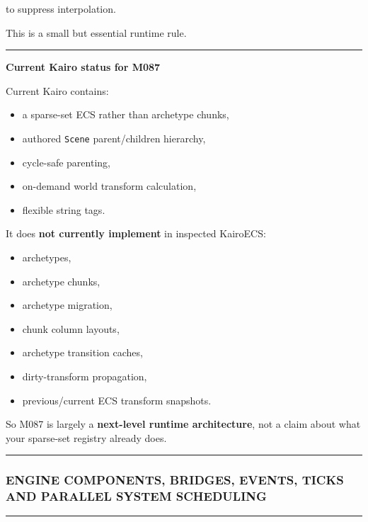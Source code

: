 to suppress interpolation.

This is a small but essential runtime rule.

\begin{center}\rule{0.5\linewidth}{0.5pt}\end{center}

\textbf{Current Kairo status for M087}

Current Kairo contains:

\begin{itemize}
\tightlist
\item
  a sparse-set ECS rather than archetype chunks,
\item
  authored \texttt{Scene} parent/children hierarchy,
\item
  cycle-safe parenting,
\item
  on-demand world transform calculation,
\item
  flexible string tags.
\end{itemize}

It does \textbf{not currently implement} in inspected KairoECS:

\begin{itemize}
\tightlist
\item
  archetypes,
\item
  archetype chunks,
\item
  archetype migration,
\item
  chunk column layouts,
\item
  archetype transition caches,
\item
  dirty-transform propagation,
\item
  previous/current ECS transform snapshots.
\end{itemize}

So M087 is largely a \textbf{next-level runtime architecture}, not a claim about what your sparse-set registry already does.

\begin{center}\rule{0.5\linewidth}{0.5pt}\end{center}

\subsubsection{ENGINE COMPONENTS, BRIDGES, EVENTS, TICKS AND PARALLEL SYSTEM SCHEDULING}\label{engine-components-bridges-events-ticks-and-parallel-system-scheduling}

\begin{center}\rule{0.5\linewidth}{0.5pt}\end{center}

